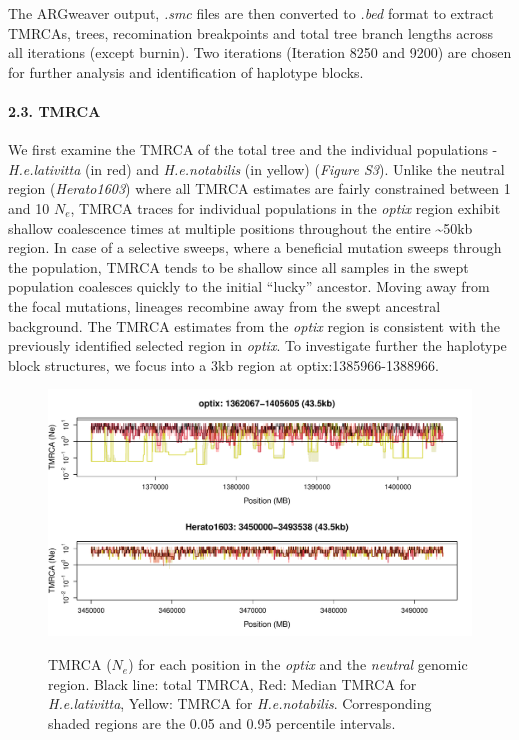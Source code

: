 \documentclass[
]{article}
\begin{document}
\hfill\break
The ARGweaver output, \emph{.smc} files are then converted to
\emph{.bed} format to extract TMRCAs, trees, recomination breakpoints
and total tree branch lengths across all iterations (except burnin). Two
iterations (Iteration 8250 and 9200) are chosen for further analysis and
identification of haplotype blocks.

\hypertarget{tmrca}{%
\paragraph{\texorpdfstring{2.3. TMRCA\\
}{2.3. TMRCA }}\label{tmrca}}
\hfill\break
We first examine the TMRCA of the total tree and the individual
populations - \emph{H.e.lativitta} (in red) and \emph{H.e.notabilis} (in
yellow) (\emph{Figure S3}). Unlike the neutral region
(\emph{Herato1603}) where all TMRCA estimates are fairly constrained
between 1 and 10 \(N_e\), TMRCA traces for individual populations in the
\emph{optix} region exhibit shallow coalescence times at multiple
positions throughout the entire \textasciitilde50kb region. In case of a
selective sweeps, where a beneficial mutation sweeps through the
population, TMRCA tends to be shallow since all samples in the swept
population coalesces quickly to the initial ``lucky'' ancestor. Moving
away from the focal mutations, lineages recombine away from the swept
ancestral background. The TMRCA estimates from the \emph{optix} region
is consistent with the previously identified selected region in
\emph{optix}. To investigate further the haplotype block structures, we
focus into a 3kb region at optix:1385966-1388966.

\begin{figure}
{\centering \includegraphics{figS3-TMRCA-1} }
\caption{ \footnotesize TMRCA ($N_e$) for each position in the \textit{optix} and the \textit{neutral} genomic region. Black line: total TMRCA, Red: Median TMRCA for \textit{H.e.lativitta}, Yellow: TMRCA for \textit{H.e.notabilis}. Corresponding shaded regions are the 0.05 and 0.95 percentile intervals.}\label{fig:figS3-TMRCA}
\end{figure}
\end{document}
